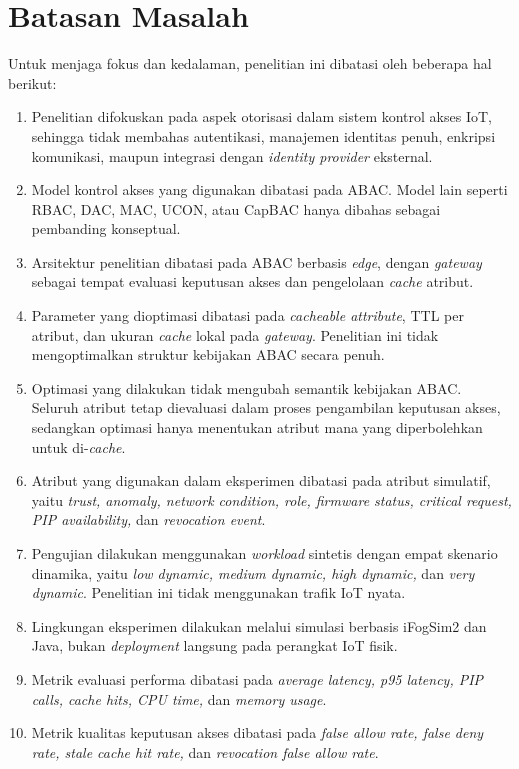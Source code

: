 \section{Batasan Masalah}

Untuk menjaga fokus dan kedalaman, penelitian ini dibatasi oleh beberapa hal berikut:

\begin{enumerate}
    \item Penelitian difokuskan pada aspek otorisasi dalam sistem kontrol akses IoT, sehingga tidak membahas autentikasi, manajemen identitas penuh, enkripsi komunikasi, maupun integrasi dengan \textit{identity provider} eksternal.
    \item Model kontrol akses yang digunakan dibatasi pada ABAC. Model lain seperti RBAC, DAC, MAC, UCON, atau CapBAC hanya dibahas sebagai pembanding konseptual.
    \item Arsitektur penelitian dibatasi pada ABAC berbasis \textit{edge}, dengan \textit{gateway} sebagai tempat evaluasi keputusan akses dan pengelolaan \textit{cache} atribut.
    \item Parameter yang dioptimasi dibatasi pada \textit{cacheable attribute}, TTL per atribut, dan ukuran \textit{cache} lokal pada \textit{gateway}. Penelitian ini tidak mengoptimalkan struktur kebijakan ABAC secara penuh.
    \item Optimasi yang dilakukan tidak mengubah semantik kebijakan ABAC. Seluruh atribut tetap dievaluasi dalam proses pengambilan keputusan akses, sedangkan optimasi hanya menentukan atribut mana yang diperbolehkan untuk di-\textit{cache}.
    \item Atribut yang digunakan dalam eksperimen dibatasi pada atribut simulatif, yaitu \textit{trust, anomaly, network condition, role, firmware status, critical request, PIP availability,} dan \textit{revocation event}.
    \item Pengujian dilakukan menggunakan \textit{workload} sintetis dengan empat skenario dinamika, yaitu \textit{low dynamic, medium dynamic, high dynamic,} dan \textit{very dynamic}. Penelitian ini tidak menggunakan trafik IoT nyata.
    \item Lingkungan eksperimen dilakukan melalui simulasi berbasis iFogSim2 dan Java, bukan \textit{deployment} langsung pada perangkat IoT fisik.
    \item Metrik evaluasi performa dibatasi pada \textit{average latency, p95 latency, PIP calls, cache hits, CPU time,} dan \textit{memory usage}.
    \item Metrik kualitas keputusan akses dibatasi pada \textit{false allow rate, false deny rate, stale cache hit rate,} dan \textit{revocation false allow rate}.

\end{enumerate}
